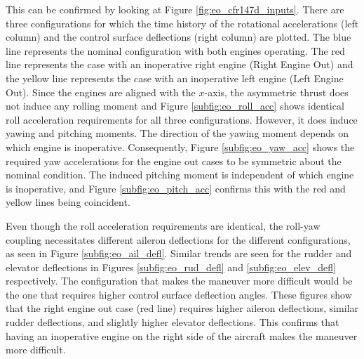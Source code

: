 This can be confirmed by looking at Figure \ref{fig:eo_cfr147d_inputs}. 
There are three configurations for which the time history of the rotational accelerations (left column) and the control surface deflections (right column) are plotted.
The blue line represents the nominal configuration with both engines operating. 
The red line represents the case with an inoperative right engine (Right Engine Out) and the yellow line represents the case with an inoperative left engine (Left Engine Out).
Since the engines are aligned with the $x$-axis, the asymmetric thrust does not induce any rolling moment and Figure \ref{subfig:eo_roll_acc} shows identical roll acceleration requirements for all three configurations.
However, it does induce yawing and pitching moments. 
The direction of the yawing moment depends on which engine is inoperative.
Consequently, Figure \ref{subfig:eo_yaw_acc} shows the required yaw accelerations for the engine out cases to be symmetric about the nominal condition. 
The induced pitching moment is independent of which engine is inoperative, and Figure \ref{subfig:eo_pitch_acc} confirms this with the red and yellow lines being coincident. 

Even though the roll acceleration requirements are identical, the roll-yaw coupling necessitates different aileron deflections for the different configurations, as seen in Figure \ref{subfig:eo_ail_defl}. 
Similar trends are seen for the rudder and elevator deflections in Figures \ref{subfig:eo_rud_defl} and \ref{subfig:eo_elev_defl} respectively. 
The configuration that makes the maneuver more difficult would be the one that requires higher control surface deflection angles. 
These figures show that the right engine out case (red line) requires higher aileron deflections, similar rudder deflections, and slightly higher elevator deflections. 
This confirms that having an inoperative engine on the right side of the aircraft makes the maneuver more difficult. 

